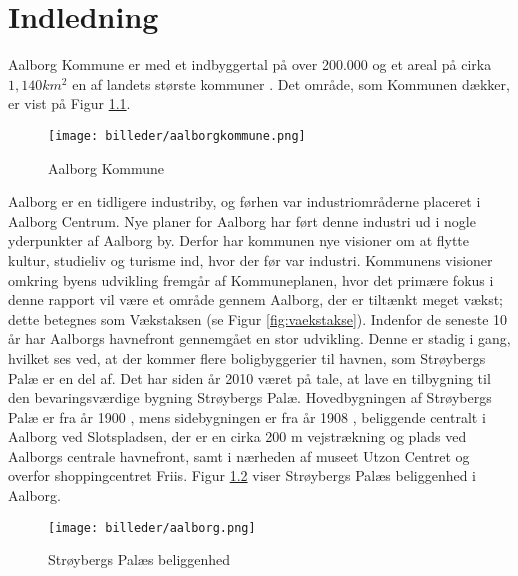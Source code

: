 \chapter{Indledning}
Aalborg Kommune er med et indbyggertal på over 200.000 og et areal på cirka  $1,\!140 km^2$ en af landets største kommuner \citep{kommunedata}. Det område, som Kommunen dækker, er vist på Figur \ref{fig:aalborgkommune}. 

\begin{figure}[htbp]
	\texttt{[image: billeder/aalborgkommune.png]}
	\caption{Aalborg Kommune}
	\label{fig:aalborgkommune}
\end{figure}

\indent{     }  Aalborg er en tidligere industriby, og førhen var industriområderne placeret i Aalborg Centrum. Nye planer for Aalborg har ført denne industri ud i nogle yderpunkter af Aalborg by. Derfor har kommunen nye visioner om at flytte kultur, studieliv og turisme ind, hvor der før var industri. Kommunens visioner omkring byens udvikling fremgår af Kommuneplanen, hvor det primære fokus i denne rapport vil være et område gennem Aalborg, der er tiltænkt meget vækst; dette betegnes som Vækstaksen (se Figur \ref{fig:vaekstakse}).
\newline \indent{     }  Indenfor de seneste 10 år har Aalborgs havnefront gennemgået en stor udvikling. Denne er stadig i gang, hvilket ses ved, at der kommer flere boligbyggerier til havnen, som Strøybergs Palæ er en del af. 
\newline \indent{     }  Det har siden år 2010 været på tale, at lave en tilbygning til den bevaringsværdige bygning Strøybergs Palæ. Hovedbygningen af Strøybergs Palæ er fra år 1900 \citep{hovedbygning}, mens sidebygningen er fra år 1908 \citep{sidebygning}, beliggende centralt i Aalborg ved Slotspladsen, der er en cirka 200 m vejstrækning og plads ved Aalborgs centrale havnefront, samt i nærheden af museet Utzon Centret og overfor shoppingcentret Friis. Figur \ref{fig:aalborg} viser Strøybergs Palæs beliggenhed i Aalborg. 

\begin{figure}[htbp]
	\centering
	\texttt{[image: billeder/aalborg.png]}
	\caption{Strøybergs Palæs beliggenhed}
	\label{fig:aalborg}
\end{figure}

